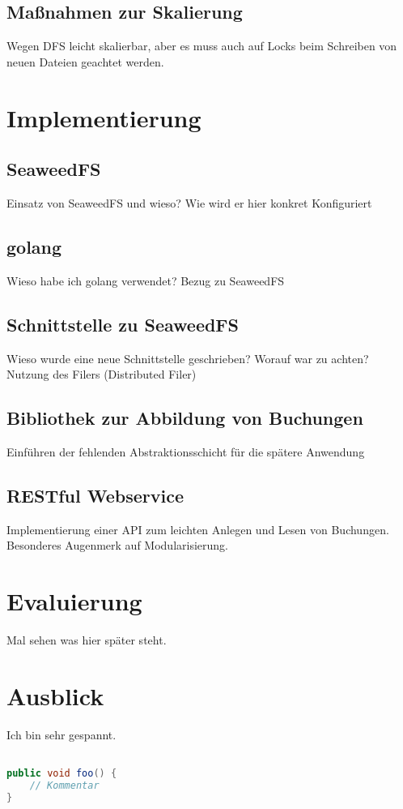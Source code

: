 \documentclass[12pt,oneside,a4paper,parskip]{scrbook}
\begin{document}
\section{Maßnahmen zur Skalierung}
Wegen DFS leicht skalierbar, aber es muss auch auf Locks beim Schreiben von neuen Dateien geachtet werden.


\chapter{Implementierung}
\section{SeaweedFS}
Einsatz von SeaweedFS und wieso?
Wie wird er hier konkret Konfiguriert
\section{golang}
Wieso habe ich golang verwendet? Bezug zu SeaweedFS 
\section{Schnittstelle zu SeaweedFS}
Wieso wurde eine neue Schnittstelle geschrieben?
Worauf war zu achten? Nutzung des Filers (Distributed Filer)
\section{Bibliothek zur Abbildung von Buchungen}
Einführen der fehlenden Abstraktionsschicht für die spätere Anwendung
\section{RESTful Webservice}
Implementierung einer API zum leichten Anlegen und Lesen von Buchungen. Besonderes Augenmerk auf Modularisierung.

\chapter{Evaluierung}
Mal sehen was hier später steht.

\chapter{Ausblick}
Ich bin sehr gespannt.

\begin{lstlisting}[label=lst:java,
				   language=java,
				   firstnumber=1,
				   caption=Beispiel für einen Quelltext]				   

public void foo() {				   
	// Kommentar
}
\end{lstlisting}
\end{document}
